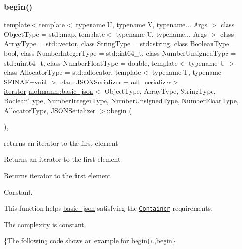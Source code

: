 \subsubsection{\texorpdfstring{begin()}{begin()}\hspace{0.1cm}{\footnotesize\ttfamily [1/2]}}
{\footnotesize\ttfamily template$<$template$<$ typename U, typename V, typename... Args $>$ class Object\+Type = std\+::map, template$<$ typename U, typename... Args $>$ class Array\+Type = std\+::vector, class String\+Type  = std\+::string, class Boolean\+Type  = bool, class Number\+Integer\+Type  = std\+::int64\+\_\+t, class Number\+Unsigned\+Type  = std\+::uint64\+\_\+t, class Number\+Float\+Type  = double, template$<$ typename U $>$ class Allocator\+Type = std\+::allocator, template$<$ typename T, typename S\+F\+I\+N\+A\+E=void $>$ class J\+S\+O\+N\+Serializer = adl\+\_\+serializer$>$ \\
\mbox{\hyperlink{classnlohmann_1_1basic__json_a099316232c76c034030a38faa6e34dca}{iterator}} \mbox{\hyperlink{classnlohmann_1_1basic__json}{nlohmann\+::basic\+\_\+json}}$<$ Object\+Type, Array\+Type, String\+Type, Boolean\+Type, Number\+Integer\+Type, Number\+Unsigned\+Type, Number\+Float\+Type, Allocator\+Type, J\+S\+O\+N\+Serializer $>$\+::begin (\begin{DoxyParamCaption}{ }\end{DoxyParamCaption})\hspace{0.3cm}{\ttfamily [inline]}, {\ttfamily [noexcept]}}



returns an iterator to the first element 

Returns an iterator to the first element.

 \begin{DoxyReturn}{Returns}
iterator to the first element
\end{DoxyReturn}
Constant.

This function helps {\ttfamily \mbox{\hyperlink{classnlohmann_1_1basic__json}{basic\+\_\+json}}} satisfying the \href{http://en.cppreference.com/w/cpp/concept/Container}{\tt Container} requirements\+:
\begin{DoxyItemize}
\item The complexity is constant.
\end{DoxyItemize}

\{The following code shows an example for {\ttfamily \mbox{\hyperlink{classnlohmann_1_1basic__json_a0ff28dac23f2bdecee9564d07f51dcdc}{begin()}}}.,begin\}


